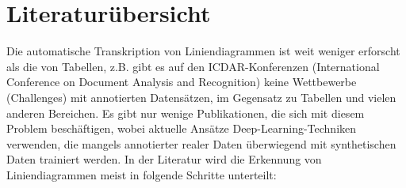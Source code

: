 \chapter{Literaturübersicht}
\label{ch:literaturübersicht}

Die automatische Transkription von Liniendiagrammen ist weit weniger erforscht als die von Tabellen, z.B. gibt es auf den ICDAR-Konferenzen (International Conference on Document Analysis and Recognition) keine Wettbewerbe (Challenges) mit annotierten Datensätzen, im Gegensatz zu Tabellen und vielen anderen Bereichen. Es gibt nur wenige Publikationen, die sich mit diesem Problem beschäftigen, wobei aktuelle Ansätze \cite{P2023LineEXDE, lee2023matgdmaterialsgraphdigitizer} Deep-Learning-Techniken verwenden, die mangels annotierter realer Daten überwiegend mit synthetischen Daten trainiert werden. In der Literatur wird die Erkennung von Liniendiagrammen meist in folgende Schritte unterteilt:

